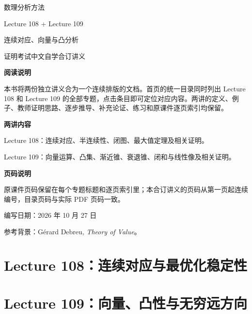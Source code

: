
\newcommand{\LectureID}{108--109}
\renewcommand{\thesection}{\thepart.\arabic{section}}
\renewcommand{\theHsection}{\arabic{part}.\arabic{section}}
\renewcommand{\theHsubsection}{\arabic{part}.\arabic{section}.\arabic{subsection}}
\makeatletter
\renewcommand{\l@section}{\@dottedtocline{1}{0em}{3.8em}}
\renewcommand{\@pnumwidth}{2.5em}
\renewcommand{\@tocrmarg}{3.5em}
\makeatother
\renewcommand{\contentsname}{108与109总目录}

\begin{titlepage}
\vspace*{1.4cm}
{\Huge\sffamily 数理分析方法\par}
\vspace{.8cm}
{\LARGE\sffamily Lecture 108 + Lecture 109\par}
\vspace{.4cm}
{\Large 连续对应、向量与凸分析\par}
\vspace{.9cm}
{\Large 证明考试中文自学合订讲义\par}
\vspace{1cm}
\textbf{阅读说明}\par
本书将两份独立讲义合为一个连续排版的文档。首页的统一目录同时列出 Lecture 108 和 Lecture 109 的全部专题，点击条目即可定位对应内容。两讲的定义、例子、教师证明思路、逐步推导、补充论证、练习和原课件逐页索引均保留。\par
\vspace{.6cm}
\textbf{两讲内容}\par
Lecture 108：连续对应、半连续性、闭图、最大值定理及相关证明。\par
Lecture 109：向量运算、凸集、渐近锥、衰退锥、闭和与线性像及相关证明。\par
\vspace{.6cm}
\textbf{页码说明}\par
原课件页码保留在每个专题标题和逐页索引里；本合订讲义的页码从第一页起连续编号，目录页码与实际 PDF 页码一致。\par
\vfill
编写日期：2026 年 10 月 27 日\par
参考背景：Gérard Debreu, \emph{Theory of Value}。\par
\end{titlepage}
\setcounter{page}{2}
\tableofcontents
\clearpage

\clearpage
\part{Lecture 108：连续对应与最优化稳定性}
\setcounter{section}{0}

\clearpage
\part{Lecture 109：向量、凸性与无穷远方向}
\setcounter{section}{0}


